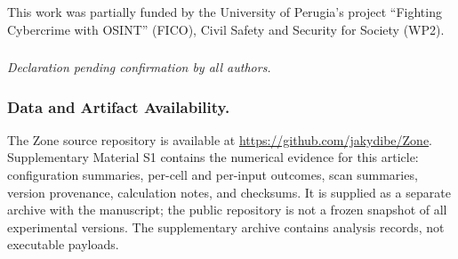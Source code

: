 \documentclass[runningheads]{llncs}
\begin{document}
\begin{credits}
\subsubsection{\ackname}
This work was partially funded by the University of Perugia's project ``Fighting Cybercrime with OSINT'' (FICO), Civil Safety and Security for Society (WP2).

\subsubsection{\discintname}
\emph{Declaration pending confirmation by all authors.}

\subsubsection{Data and Artifact Availability.}
The Zone source repository is available at
\url{https://github.com/jakydibe/Zone}. Supplementary Material S1 contains
the numerical evidence for this article: configuration summaries,
per-cell and per-input outcomes, scan summaries, version provenance,
calculation notes, and checksums. It is supplied as a separate archive
with the manuscript; the public repository is not a frozen snapshot of
all experimental versions. The supplementary archive contains analysis
records, not executable payloads.

\end{credits}



\end{document}
